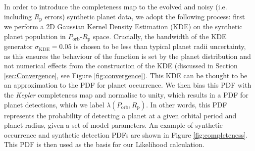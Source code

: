 \documentclass[fleqn,usenatbib]{mnras}
\begin{document}
In order to introduce the completeness map to the evolved and noisy (i.e. including $R_\text{p}$ errors) synthetic planet data, we adopt the following process: first we perform a 2D Gaussian Kernel Density Estimation (KDE) on the synthetic planet population in $P_\text{orb}$-$R_\text{p}$ space. Crucially, the bandwidth of the KDE generator $\sigma_\text{KDE} = 0.05$ is chosen to be less than typical planet radii uncertainty, as this ensures the behaviour of the function is set by the planet distribution and not numerical effects from the construction of the KDE (discussed in Section \ref{sec:Convergence}, see Figure \ref{fig:convergence}). This KDE can be thought to be an approximation to the PDF for planet occurrence. We then bias this PDF with the \textit{Kepler} completeness map and normalise to unity, which results in a PDF for planet detections, which we label $\lambda(P_\text{orb}, R_\text{p})$. In other words, this PDF represents the probability of detecting a planet at a given orbital period and planet radius, given a set of model parameters. An example of synthetic occurrence and synthetic detection PDFs are shown in Figure \ref{fig:completeness}. This PDF is then used as the basis for our Likelihood calculation.
\end{document}
